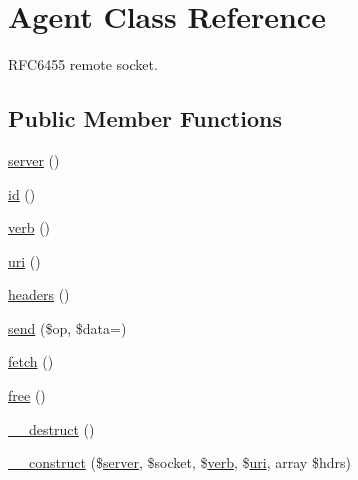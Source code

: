 \hypertarget{class_c_l_i_1_1_agent}{}\section{Agent Class Reference}
\label{class_c_l_i_1_1_agent}


R\+F\+C6455 remote socket.  


\subsection*{Public Member Functions}
\begin{DoxyCompactItemize}
\item 
\hyperlink{class_c_l_i_1_1_agent_a7c9f420ffaecd938d5934b8a93e69b47}{server} ()
\item 
\hyperlink{class_c_l_i_1_1_agent_a087060b582403885d08e89ad894ecc5d}{id} ()
\item 
\hyperlink{class_c_l_i_1_1_agent_ac29fe6b3e646c01c88b3930d98ae3891}{verb} ()
\item 
\hyperlink{class_c_l_i_1_1_agent_a511a620c07a0ee6437d26cd256e22429}{uri} ()
\item 
\hyperlink{class_c_l_i_1_1_agent_acf17788084df5a3d3415f4d9e346471d}{headers} ()
\item 
\hyperlink{class_c_l_i_1_1_agent_ac9dd53c0c506703aeabb74246830c2e9}{send} (\$op, \$data=\textquotesingle{}\textquotesingle{})
\item 
\hyperlink{class_c_l_i_1_1_agent_ae48cc10bd727774bb36203986ce3b176}{fetch} ()
\item 
\hyperlink{class_c_l_i_1_1_agent_a5ad8044ee4b8a2c8bdb8b5c3dc786424}{free} ()
\item 
\hyperlink{class_c_l_i_1_1_agent_a421831a265621325e1fdd19aace0c758}{\+\_\+\+\_\+destruct} ()
\item 
\hyperlink{class_c_l_i_1_1_agent_adc71118d74293287e2c19e556cbb8bf9}{\+\_\+\+\_\+construct} (\$\hyperlink{class_c_l_i_1_1_agent_a7c9f420ffaecd938d5934b8a93e69b47}{server}, \$socket, \$\hyperlink{class_c_l_i_1_1_agent_ac29fe6b3e646c01c88b3930d98ae3891}{verb}, \$\hyperlink{class_c_l_i_1_1_agent_a511a620c07a0ee6437d26cd256e22429}{uri}, array \$hdrs)
\end{DoxyCompactItemize}
